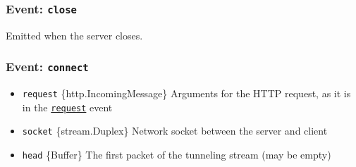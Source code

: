 \begin{Shaded}
\begin{Highlighting}[]
\NormalTok{(}\OperatorTok{,}\OperatorTok{,}\KeywordTok{=\textgreater{}}\NormalTok{ \{}
   \OperatorTok{===}  \OperatorTok{||} \OperatorTok{!}\NormalTok{) \{}
    \OperatorTok{;}
\NormalTok{  \}}

\NormalTok{(}\StringTok{\textquotesingle{}}\NormalTok{)}\OperatorTok{;}
\NormalTok{\})}\OperatorTok{;}
\end{Highlighting}
\end{Shaded}

\subsubsection{\texorpdfstring{Event:
\texttt{\textquotesingle{}close\textquotesingle{}}}{Event: \textquotesingle close\textquotesingle{}}}\label{event-close-1}

Emitted when the server closes.

\subsubsection{\texorpdfstring{Event:
\texttt{\textquotesingle{}connect\textquotesingle{}}}{Event: \textquotesingle connect\textquotesingle{}}}\label{event-connect-1}

\begin{itemize}
\tightlist
\item
  \texttt{request} \{http.IncomingMessage\} Arguments for the HTTP
  request, as it is in the
  \hyperref[event-request]{\texttt{\textquotesingle{}request\textquotesingle{}}}
  event
\item
  \texttt{socket} \{stream.Duplex\} Network socket between the server
  and client
\item
  \texttt{head} \{Buffer\} The first packet of the tunneling stream (may
  be empty)
\end{itemize}

